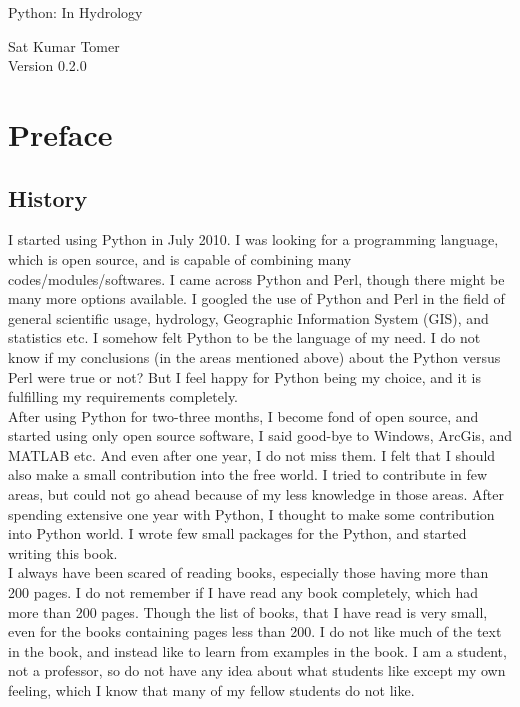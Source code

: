 \documentclass[10pt]{book}
\newcommand{\thetitle}{Python: In Hydrology}
\newcommand{\theversion}{0.2.0}
\begin{document}

\begin{htmlonly}


{\Large \thetitle}

{\large Sat Kumar Tomer} \\


Version \theversion

\setcounter{chapter}{-1}

\end{htmlonly}

\chapter{Preface}

\section*{History}

I started using Python in July 2010. I was looking for a programming language, 
which is open source, and is capable of combining many codes/modules/softwares. 
I came across Python and Perl, though there might be many more options available. 
I googled the use of Python and Perl in the field of general scientific usage, 
hydrology, Geographic Information System (GIS), and statistics etc. 
I somehow felt Python to be the language of my need. 
I do not know if my conclusions (in the areas mentioned above) about the Python 
versus Perl were true or not? But I feel happy for Python being my choice, 
and it is fulfilling my requirements completely. \\

After using Python for two-three months, I become fond of open source, 
and started using only open source software, I said good-bye to Windows, 
ArcGis, and MATLAB etc. And even after one year, I do not miss them. 
I felt that I should also make a small contribution into the free world. 
I tried to contribute in few areas, but could not go ahead because of my 
less knowledge in those areas. After spending extensive one year with Python, 
I thought to make some contribution into Python world. 
I wrote few small packages for the Python, and started writing this book. \\

I always have been scared of reading books, 
especially those having more than 200 pages. 
I do not remember if I have read any book completely, 
which had more than 200 pages. Though the list of books, 
that I have read is very small, even for the books containing pages less than 200. 
I do not like much of the text in the book, 
and instead like to learn from examples in the book. 
I am a student, not a professor, so do not have any idea about what students 
like except my own feeling, which I know that many of my fellow students do not like. \\
\end{document}
